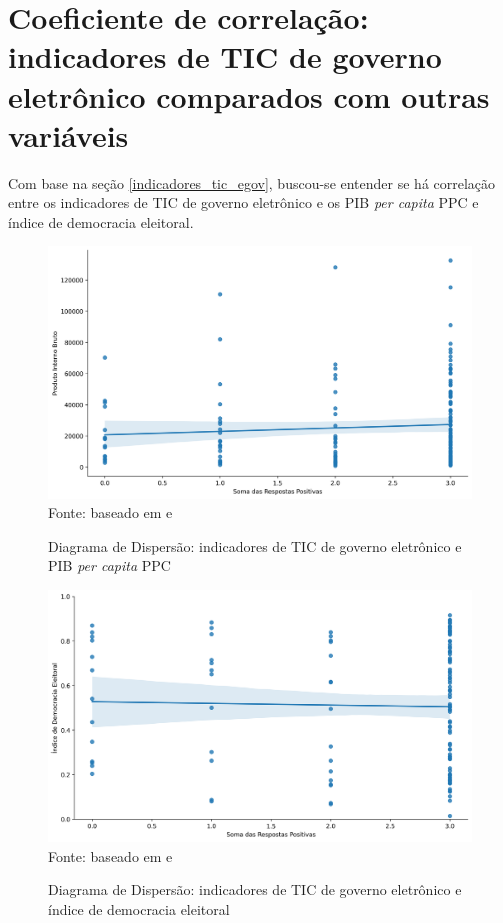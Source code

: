\section{Coeficiente de correlação: indicadores de TIC de governo eletrônico comparados com outras variáveis}

Com base na seção \ref{indicadores_tic_egov}, buscou-se entender se há correlação entre os indicadores de TIC de governo eletrônico e os PIB \textit{per capita} PPC e índice de democracia eleitoral.

\begin{figure}[H]
	\centering
	\caption{Diagrama de Dispersão: indicadores de TIC de governo eletrônico e PIB \textit{per capita} PPC}
	\includegraphics[width=1\linewidth]{figuras/ict_in_government/dispersao_ticegov_pib}
	\label{fig:dispersao_ticegov_pib}
	\footnotesize{Fonte: baseado em \cite{WB_pib_per_capita_países} e \cite{ONU_ICT_in_government_indicators}}
\end{figure}

\begin{figure}[H]
	\centering
	\caption{Diagrama de Dispersão: indicadores de TIC de governo eletrônico e índice de democracia eleitoral}
	\includegraphics[width=1\linewidth]{figuras/ict_in_government/dispersao_ticegov_indicedemocracia}
	\label{fig:dispersao_ticegov_indicedemocracia}
	\footnotesize{Fonte: baseado em \cite{electoral_democracy_index} e \cite{ONU_ICT_in_government_indicators}}
\end{figure}

